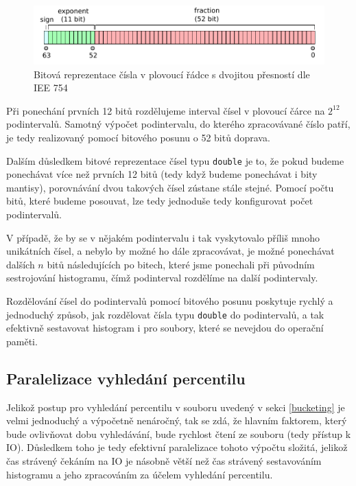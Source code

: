 \documentclass[12pt, a4paper]{article}
\begin{document}
\begin{figure}[!ht]
    \centering 
    \includegraphics[width=1\textwidth]{pdf/double.pdf}
    \caption{Bitová reprezentace čísla v plovoucí řádce s dvojitou přesností dle IEE 754}
\end{figure}

Při ponechání prvních 12 bitů rozdělujeme interval čísel v plovoucí čárce na $2^{12}$ podintervalů.
Samotný výpočet podintervalu, do kterého zpracovávané číslo patří, je tedy realizovaný pomocí bitového posunu o 52 bitů doprava.

Dalším důsledkem bitové reprezentace čísel typu \texttt{double} je to, že pokud budeme ponechávat více než prvních 12 bitů (tedy když budeme ponechávat i bity mantisy), porovnávání dvou takových čísel zústane stále stejné.
Pomocí počtu bitů, které budeme posouvat, lze tedy jednoduše tedy konfigurovat počet podintervalů.

V případě, že by se v nějakém podintervalu i tak vyskytovalo příliš mnoho unikátních čísel, a nebylo by možné ho dále zpracovávat, je možné ponechávat dalších $n$ bitů následujících po bitech, které jsme ponechali při původním sestrojování histogramu, čímž podinterval rozdělíme na další podintervaly.

Rozdělování čísel do podintervalů pomocí bitového posunu poskytuje rychlý a jednoduchý způsob, jak rozdělovat čísla typu \texttt{double} do podintervalů, a tak efektivně sestavovat histogram i pro soubory, které se nevejdou do operační paměti.

\subsection{Paralelizace vyhledání percentilu}
Jelikož postup pro vyhledání percentilu v souboru uvedený v sekci \ref{bucketing} je velmi jednoduchý a výpočetně nenáročný, tak se zdá, že hlavním faktorem, který bude ovlivňovat dobu vyhledávání, bude rychlost čtení ze souboru (tedy přístup k IO).
Důsledkem toho je tedy efektivní paralelizace tohoto výpočtu složitá, jelikož čas strávený čekáním na IO je násobně větší než čas strávený sestavováním histogramu a jeho zpracováním za účelem vyhledání percentilu.
\end{document}
